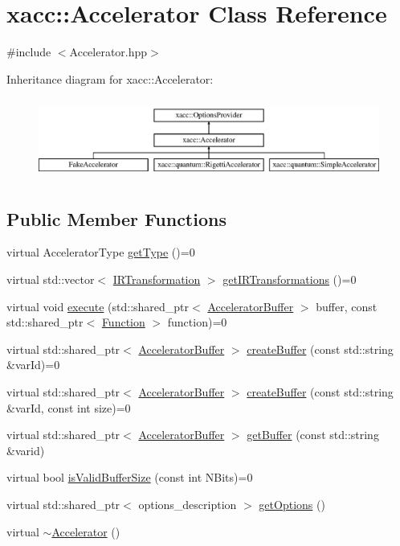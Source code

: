 \hypertarget{a02432}{}\section{xacc\+:\+:Accelerator Class Reference}
\label{a02432}


{\ttfamily \#include $<$Accelerator.\+hpp$>$}

Inheritance diagram for xacc\+:\+:Accelerator\+:\begin{figure}[H]
\begin{center}
\leavevmode
\includegraphics[height=2.679426cm]{a02432}
\end{center}
\end{figure}
\subsection*{Public Member Functions}
\begin{DoxyCompactItemize}
\item 
virtual Accelerator\+Type \hyperlink{a02432_aaffc3e4bb9880eb5041b1b58ee4c2665}{get\+Type} ()=0
\item 
virtual std\+::vector$<$ \hyperlink{a02484}{I\+R\+Transformation} $>$ \hyperlink{a02432_ad6e4a642dcb24e552675bcbeff1e1b04}{get\+I\+R\+Transformations} ()=0
\item 
virtual void \hyperlink{a02432_a89b3f3e6294f228abf03a410b0fb1674}{execute} (std\+::shared\+\_\+ptr$<$ \hyperlink{a02444}{Accelerator\+Buffer} $>$ buffer, const std\+::shared\+\_\+ptr$<$ \hyperlink{a02456}{Function} $>$ function)=0
\item 
virtual std\+::shared\+\_\+ptr$<$ \hyperlink{a02444}{Accelerator\+Buffer} $>$ \hyperlink{a02432_aab5046e8d83ab390302e0f49533e95fc}{create\+Buffer} (const std\+::string \&var\+Id)=0
\item 
virtual std\+::shared\+\_\+ptr$<$ \hyperlink{a02444}{Accelerator\+Buffer} $>$ \hyperlink{a02432_a064a2dbd58338364115c260267806945}{create\+Buffer} (const std\+::string \&var\+Id, const int size)=0
\item 
virtual std\+::shared\+\_\+ptr$<$ \hyperlink{a02444}{Accelerator\+Buffer} $>$ \hyperlink{a02432_ab3820be326e28a553fed1a824f4d41d0}{get\+Buffer} (const std\+::string \&varid)
\item 
virtual bool \hyperlink{a02432_ae51584850faeec77299058383977ddeb}{is\+Valid\+Buffer\+Size} (const int N\+Bits)=0
\item 
virtual std\+::shared\+\_\+ptr$<$ options\+\_\+description $>$ \hyperlink{a02432_a98c9eda6b54367c75667ecfbbf167979}{get\+Options} ()
\item 
virtual \hyperlink{a02432_aed88ab0d71b765f0b0f512684ccd4b55}{$\sim$\+Accelerator} ()
\end{DoxyCompactItemize}
